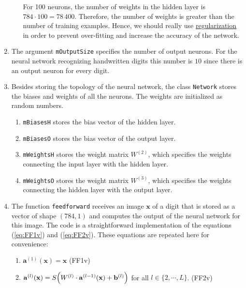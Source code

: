 \begin{enumerate}
\begin{enumerate}[(a)]
            For 100 neurons, the number of weights in the hidden layer is $784 \cdot 100 = 78\,400$.
            Therefore, the number of weights is greater than the number of training examples.  Hence,
            we should really use \href{http://neuralnetworksanddeeplearning.com/chap3.html}{regularization} in
            order to prevent over-fitting and increase the accuracy of the network.
      \end{enumerate}
\item The argument \texttt{mOutputSize} specifies the number of output neurons.  For the neural network
      recognizing handwritten digits this number is $10$ since there is an output neuron for every digit.
\item Besides storing the topology of the neural network, the class \texttt{Network} stores the biases and
      weights of all the neurons.  The weights are initialized as random numbers.
      \begin{enumerate}
      \item \texttt{mBiasesH} stores the bias vector of the hidden layer.
      \item \texttt{mBiasesO} stores the bias vector of the output layer.
      \item \texttt{mWeightsH} stores the weight matrix $W^{(2)}$, which specifies the weights connecting the
            input layer with the hidden layer.
      \item \texttt{mWeightsO} stores the weight matrix $W^{(3)}$, which specifies the weights connecting the
            hidden layer with the output layer.
      \end{enumerate}
\item The function \texttt{feedforward} receives an image $\mathbf{x}$ of a digit that is stored as a vector of
      shape $(784,1)$ and computes the output of the
      neural network for this image.  The code is a straightforward implementation of the equations
      (\ref{eq:FF1v}) and (\ref{eq:FF2v}).  These equations are repeated here for convenience:
      \begin{enumerate}
      \item $\mathbf{a}^{(1)}(\mathbf{x}) = \mathbf{x}$ \hspace*{\fill} (FF1v)
      \item $\mathbf{a}^{(l)}(\mathbf{x}) = S\Bigl( W^{(l)} \cdot \mathbf{a}^{(l-1)}(\mathbf{x}) + \mathbf{b}^{(l)}\Bigr)$
             \quad for all $l \in \{2, \cdots, L\}$. \hspace*{\fill} (FF2v)
      \end{enumerate}

\end{enumerate}
